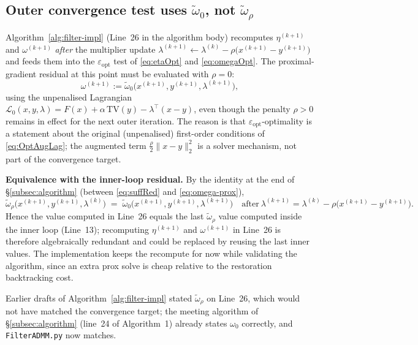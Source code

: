 \documentclass[11pt]{article}
\newcommand{\TV}{\mathrm{TV}}
\begin{document}
\subsection{Outer convergence test uses $\widetilde{\omega}_0$, not $\widetilde{\omega}_\rho$}\label{subsec:omega-zero}

Algorithm~\ref{alg:filter-impl} (Line~26 in the algorithm body) recomputes
$\eta^{(k+1)}$ and $\omega^{(k+1)}$ \emph{after} the multiplier update
$\lambda^{(k+1)} \gets \lambda^{(k)} - \rho\bigl(x^{(k+1)} - y^{(k+1)}\bigr)$
and feeds them into the $\varepsilon_{\mathrm{opt}}$ test of
\eqref{eq:etaOpt} and \eqref{eq:omegaOpt}. The proximal-gradient residual at
this point must be evaluated with $\rho = 0$:
\begin{equation}\label{eq:omega-zero}
  \omega^{(k+1)} := \widetilde{\omega}_0\bigl(x^{(k+1)}, y^{(k+1)}, \lambda^{(k+1)}\bigr),
\end{equation}
using the unpenalised Lagrangian
$\mathcal{L}_0(x,y,\lambda) = F(x) + \alpha\,\TV(y) - \lambda^\top(x-y)$,
even though the penalty $\rho > 0$ remains in effect for the next outer
iteration. The reason is that $\varepsilon_{\mathrm{opt}}$-optimality is a
statement about the original (unpenalised) first-order conditions of
\eqref{eq:OptAugLag}; the augmented term $\tfrac{\rho}{2}\|x-y\|_2^2$ is a
solver mechanism, not part of the convergence target.

\medskip
\noindent\textbf{Equivalence with the inner-loop residual.}
By the identity at the end of \S\ref{subsec:algorithm} (between
\eqref{eq:suffRed} and \eqref{eq:omega-prox}),
\begin{equation}\label{eq:omega-rho-zero-identity}
  \widetilde{\omega}_\rho\bigl(x^{(k+1)}, y^{(k+1)}, \lambda^{(k)}\bigr)
  \;=\;
  \widetilde{\omega}_0\bigl(x^{(k+1)}, y^{(k+1)}, \lambda^{(k+1)}\bigr)
  \quad
  \text{after}\
  \lambda^{(k+1)} = \lambda^{(k)} - \rho\bigl(x^{(k+1)} - y^{(k+1)}\bigr).
\end{equation}
Hence the value computed in Line~26 equals the last
$\widetilde{\omega}_\rho$ value computed inside the inner loop (Line~13);
recomputing $\eta^{(k+1)}$ and $\omega^{(k+1)}$ in Line~26 is therefore
algebraically redundant and could be replaced by reusing the last inner
values. The implementation keeps the recompute for now while validating the
algorithm, since an extra prox solve is cheap relative to the
restoration backtracking cost.

Earlier drafts of Algorithm~\ref{alg:filter-impl} stated $\widetilde{\omega}_\rho$ on Line~26, which would not have matched the convergence target; the meeting algorithm of \S\ref{subsec:algorithm} (line~24 of Algorithm~1) already states $\omega_0$ correctly, and \texttt{FilterADMM.py} now matches.
\end{document}
